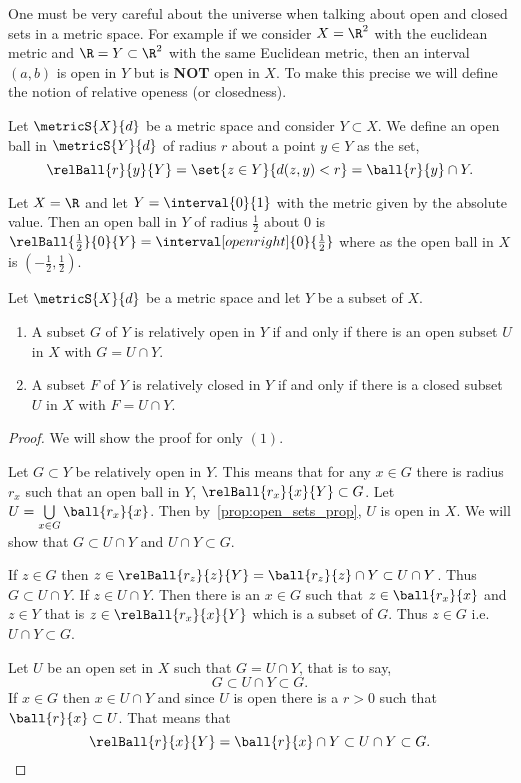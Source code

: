 One must be very careful about the universe when talking about open and closed sets in a metric space. For
example if we consider $X = \R^2$ with the euclidean metric and $\R = Y \subset \R^2$ with the same Euclidean
metric, then an interval $(a,b)$ is open in $Y$ but is \textbf{NOT} open in $X$. To make this precise we will
define the notion of relative openess (or closedness).

\begin{Definition}[name=Open balls in subspace]
    Let $\metricS{X}{d}$ be a metric space and consider $Y \subset X$. We define an open ball in
    $\metricS{Y}{d}$ of radius $r$
    about a point $y \in Y$ as the set,
    \[\relBall{r}{y}{Y} = \set{z\in Y}{d(z,y) < r} = \ball{r}{y}\cap Y.\]
\end{Definition}
\begin{Example}
    Let $X = \R$ and let $Y = \interval{0}{1}$ with the metric given by the absolute value. 
    Then an open ball in $Y$ of radius $\frac{1}{2}$ about $0$ is
    $\relBall{\frac{1}{2}}{0}{Y} = \interval[open right]{0}{\frac{1}{2}}$ where as the open ball in $X$ is 
    $(-\frac{1}{2},\frac{1}{2})$.
\end{Example}

\begin{Proposition}\label{prop:open_relative}
    Let $\metricS{X}{d}$ be a metric space and let $Y$ be a subset of $X$.
    \begin{enumerate}
	\item
	    A subset $G$ of $Y$ is relatively open in $Y$ if and only if there is an open subset $U$ in $X$
	    with $G = U \cap Y$.
	\item
	    A subset $F$ of $Y$ is relatively closed in $Y$ if and only if there is a closed subset $U$ in $X$
	    with $F = U \cap Y$.
    \end{enumerate}
\end{Proposition}
\begin{proof}
    We will show the proof for only $(1)$.
   
    Let $G\subset Y$ be relatively open in $Y$. This means that for any
    $x \in G$ there is radius $r_x$ such that an open ball in $Y$, $\relBall{r_x}{x}{Y} \subset G$.
    Let $U =
    \bigcup\limits_{x\in G}\ball{r_x}{x}$. Then by~\ref{prop:open_sets_prop}, $U$ is open in $X$. We will show
    that $G \subset U \cap Y$ and $U\cap Y \subset G$.

    If $z \in G$ then $z \in \relBall{r_z}{z}{Y} = \ball{r_z}{z}\cap Y
    \subset U\cap Y$. Thus $G \subset U \cap Y$. If $z \in U\cap Y$. Then there is an
    $x\in G$ such that $z \in \ball{r_x}{x}$ and $z \in Y$ that is $z \in \relBall{r_x}{x}{Y}$ which is a
    subset of $G$. Thus $z \in G$ i.e.~$U\cap Y \subset G$. 

    Let $U$ be an open set in $X$ such that $G = U\cap Y$, that is to say,
    \[G \subset U \cap Y \subset G.\]
    If $x \in G$ then $x \in U \cap Y$ and since $U$ is open there is a $r > 0$ such that $\ball{r}{x} \subset
    U$. That means that \[\relBall{r}{x}{Y} = \ball{r}{x}\cap Y \subset U \cap Y \subset G.\] 
\end{proof}

